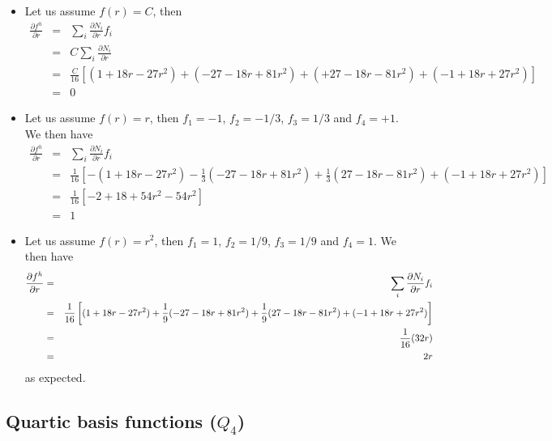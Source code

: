 \begin{itemize}
\item
Let us assume $f(r)=C$, then
\begin{eqnarray}
\frac{\partial f^h}{\partial r} 
&=& \sum_i \frac{\partial N_i}{\partial r} f_i  \nonumber\\
&=&  C \sum_i \frac{\partial N_i}{\partial r}  \nonumber\\
&=& \frac{C}{16} [  (  1 +18r - 27r^2 ) 
+ (-27 -18r + 81r^2 )  
+  (+27 -18r - 81r^2 ) 
+ ( -1 +18r + 27r^2 ) ]  \nonumber\\
&=& 0 \nonumber
\end{eqnarray}

\item
Let us assume $f(r)= r$, then $f_1=-1$, $f_2=-1/3$, $f_3=1/3$ and $f_4=+1$. We then have
\begin{eqnarray}
\frac{\partial f^h}{\partial r} 
&=& \sum_i \frac{\partial N_i}{\partial r} f_i  \nonumber\\
&=& \frac{1}{16} [  -(  1 +18r - 27r^2 ) 
 -\frac{1}{3} (-27 -18r + 81r^2 )  
 +\frac{1}{3} (27 -18r - 81r^2 )
 + ( -1 +18r + 27r^2 ) ]  \nonumber\\
&=& \frac{1}{16} [-2 + 18 + 54r^2 - 54r^2] \nonumber\\
&=& 1 \nonumber
\end{eqnarray}

\item
Let us assume $f(r)= r^2$, then $f_1=1$, $f_2=1/9$, $f_3=1/9$ and $f_4=1$. We then have
\begin{eqnarray}
\frac{\partial f^h}{\partial r} 
&=& \sum_i \frac{\partial N_i}{\partial r} f_i  \nonumber\\
&=& \frac{1}{16} \left[  
(  1 +18r - 27r^2 ) 
+\frac19 (-27 -18r + 81r^2 )  
+\frac19  (27 -18r - 81r^2 )
+ ( -1 +18r + 27r^2 ) \right]  \nonumber\\
&=& \frac{1}{16}(32r) \nonumber\\
&=& 2r
\end{eqnarray}
as expected.




\end{itemize}

\subsection{Quartic basis functions ($Q_4$) \label{sec:bf4}}

